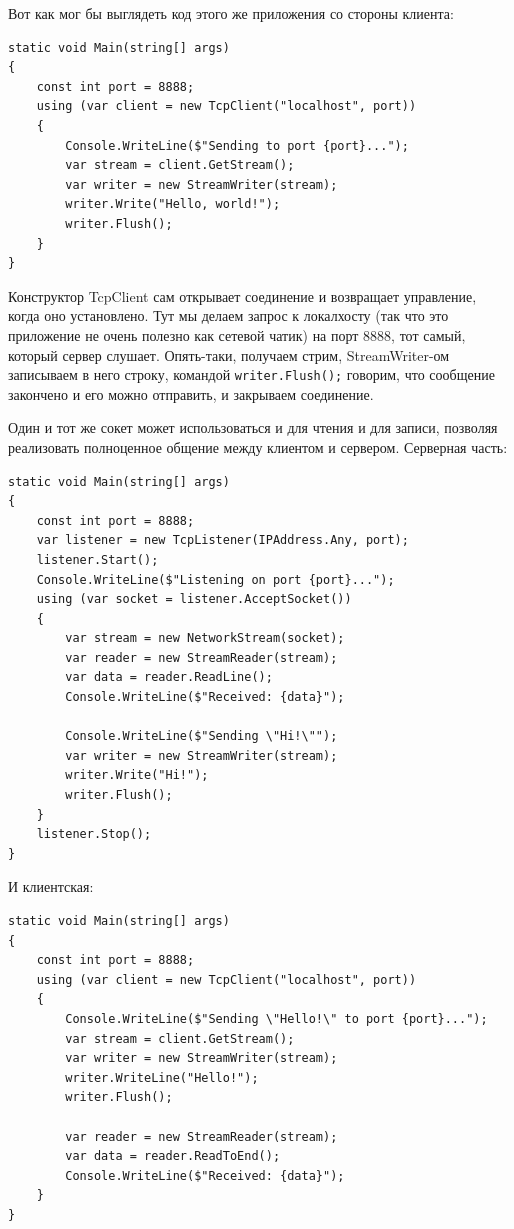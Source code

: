 \documentclass{../../text-style}
\begin{document}
Вот как мог бы выглядеть код этого же приложения со стороны клиента:

\begin{verbatim}
static void Main(string[] args)
{
    const int port = 8888;
    using (var client = new TcpClient("localhost", port))
    {
        Console.WriteLine($"Sending to port {port}...");
        var stream = client.GetStream();
        var writer = new StreamWriter(stream);
        writer.Write("Hello, world!");
        writer.Flush();
    }
}
\end{verbatim}

Конструктор TcpClient сам открывает соединение и возвращает управление, когда оно установлено. Тут мы делаем запрос к локалхосту (так что это приложение не очень полезно как сетевой чатик) на порт 8888, тот самый, который сервер слушает. Опять-таки, получаем стрим, StreamWriter-ом записываем в него строку, командой \texttt{writer.Flush();} говорим, что сообщение закончено и его можно отправить, и закрываем соединение.

Один и тот же сокет может использоваться и для чтения и для записи, позволяя реализовать полноценное общение между клиентом и сервером. Серверная часть:

\begin{verbatim}
static void Main(string[] args)
{
    const int port = 8888;
    var listener = new TcpListener(IPAddress.Any, port);
    listener.Start();
    Console.WriteLine($"Listening on port {port}...");
    using (var socket = listener.AcceptSocket())
    {
        var stream = new NetworkStream(socket);
        var reader = new StreamReader(stream);
        var data = reader.ReadLine();
        Console.WriteLine($"Received: {data}");

        Console.WriteLine($"Sending \"Hi!\"");
        var writer = new StreamWriter(stream);
        writer.Write("Hi!");
        writer.Flush();
    }
    listener.Stop();
}
\end{verbatim}

И клиентская: 

\begin{verbatim}
static void Main(string[] args)
{
    const int port = 8888;
    using (var client = new TcpClient("localhost", port))
    {
        Console.WriteLine($"Sending \"Hello!\" to port {port}...");
        var stream = client.GetStream();
        var writer = new StreamWriter(stream);
        writer.WriteLine("Hello!");
        writer.Flush();

        var reader = new StreamReader(stream);
        var data = reader.ReadToEnd();
        Console.WriteLine($"Received: {data}");
    }
}
\end{verbatim}
\end{document}
